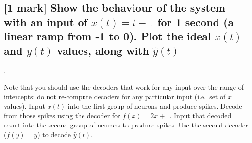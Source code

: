 \documentclass{article}
\begin{document}
\subsection{{[}1 mark{]} Show the behaviour of the system with an input of
$x(t)=t-1$ for 1 second (a linear ramp from -1 to 0). Plot the ideal
$x(t)$ and $y(t)$ values, along with $\hat{y}(t)$}.

Note that you should use the decoders that work for any input over the range of intercepts: do not re-compute decoders for any particular input (i.e.~set of $x$ values). Input $x(t)$ into the first group of neurons and produce spikes. Decode from those spikes using the decoder for $f(x)=2x+1$. Input that decoded result into the second group of neurons to produce spikes. Use the second decoder ($f(y)=y$) to decode $\hat{y}(t)$.
\end{document}
